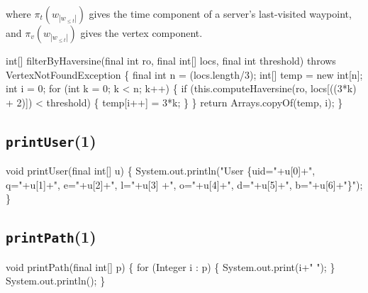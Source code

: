 \noindent
where $\pi_t(w_{|w_{\leq t}|})$ gives the time component of a server's
last-visited waypoint, and $\pi_v(w_{|w_{\leq t}|})$ gives the vertex
component.

\nwenddocs{}\endmoddef{}
int[] filterByHaversine(final int ro, final int[] locs, final int threshold)
throws VertexNotFoundException \{
  final int n = (locs.length/3);
  int[] temp = new int[n];
  int i = 0;
  for (int k = 0; k < n; k++) \{
    if (this.computeHaversine(ro, locs[((3*k) + 2)]) < threshold) \{
      temp[i++] = 3*k;
    \}
  \}
  return Arrays.copyOf(temp, i);
\}
\eatline
{}\nwendcode{}\nwdocspar
\subsection{\texttt{printUser}(1)}
\nwenddocs{}\endmoddef{}
void printUser(final int[] u) \{
  System.out.println("User \{uid="+u[0]+", q="+u[1]+", e="+u[2]+", l="+u[3]
    +", o="+u[4]+", d="+u[5]+", b="+u[6]+"\}");
\}
\eatline
{}\nwendcode{}\nwdocspar
\subsection{\texttt{printPath}(1)}
\nwenddocs{}\endmoddef{}
void printPath(final int[] p) \{
  for (Integer i : p) \{
    System.out.print(i+" ");
  \}
  System.out.println();
\}
\eatline
{}\nwendcode{}\nwdocspar
